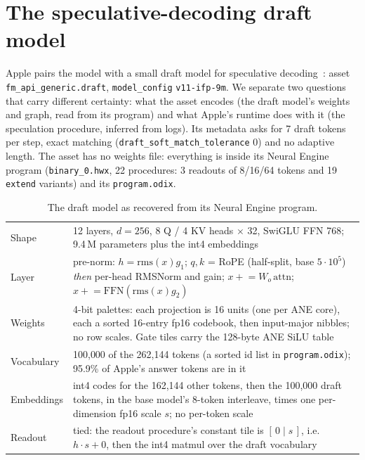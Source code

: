 \documentclass[11pt,reqno]{amsart}
\newcommand{\code}[1]{\texttt{#1}}
\theoremstyle{definition}
\begin{document}
\section{The speculative-decoding draft model}\label{sec:draft}

Apple pairs the model with a small draft model for speculative decoding~\cite{leviathan2023speculative}: asset \code{fm\_api\_generic.draft}, \code{model\_config} \code{v11-ifp-9m}. We separate two questions that carry different certainty: what the asset encodes (the draft model's weights and graph, read from its program) and what Apple's runtime does with it (the speculation procedure, inferred from logs). Its metadata asks for 7 draft tokens per step, exact matching (\code{draft\_soft\_match\_tolerance} 0) and no adaptive length. The asset has no weights file: everything is inside its Neural Engine program (\code{binary\_0.hwx}, 22 procedures: 3 readouts of 8/16/64 tokens and 19 \code{extend} variants) and its \code{program.odix}.

\begin{table}[H]
\centering\small
\begin{tabular}{@{}p{34mm}p{124mm}@{}}
\toprule
Shape & 12 layers, $d=256$, 8 Q / 4 KV heads $\times$ 32, SwiGLU FFN 768; 9.4\,M parameters plus the int4 embeddings \\
Layer & pre-norm: $h=\mathrm{rms}(x)g_1$; $q,k$ = RoPE (half-split, base $5\cdot10^5$) \emph{then} per-head RMSNorm and gain; $x \mathrel{+}= W_o\,\mathrm{attn}$; $x \mathrel{+}= \mathrm{FFN}(\mathrm{rms}(x)g_2)$ \\
Weights & 4-bit palettes: each projection is 16 units (one per ANE core), each a sorted 16-entry fp16 codebook, then input-major nibbles; no row scales. Gate tiles carry the 128-byte ANE SiLU table \\
Vocabulary & 100{,}000 of the 262{,}144 tokens (a sorted id list in \code{program.odix}); 95.9\% of Apple's answer tokens are in it \\
Embeddings & int4 codes for the 162{,}144 other tokens, then the 100{,}000 draft tokens, in the base model's 8-token interleave, times one per-dimension fp16 scale $s$; no per-token scale \\
Readout & tied: the readout procedure's constant tile is $[\,0 \mid s\,]$, i.e.\ $h\cdot s + 0$, then the int4 matmul over the draft vocabulary \\
\bottomrule
\end{tabular}
\caption{The draft model as recovered from its Neural Engine program.}
\label{tab:draft}
\end{table}
\end{document}
